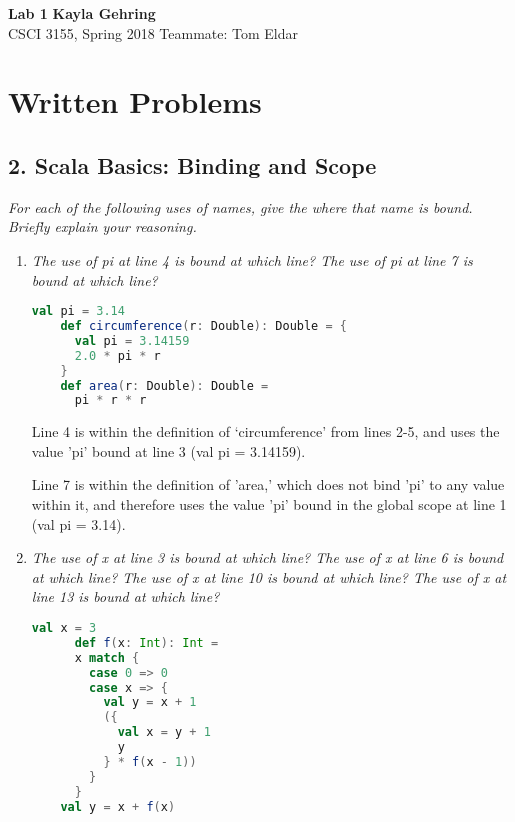 \documentclass[a4paper, 10pt]{article}
\begin{document}
\noindent
\large\textbf{Lab 1} \hfill \textbf{Kayla Gehring} \\
\normalsize CSCI 3155, Spring 2018 \hfill Teammate: Tom Eldar \\

\section*{Written Problems}

\subsection*{2. Scala Basics: Binding and Scope}
\textit{For each of the following uses of names, give the where that name is bound. Briefly explain your reasoning.}

\begin{enumerate}[label=(\alph*)]

\item\textit{The use of pi at line 4 is bound at which line? The use of pi at line 7 is bound at which line?}

  \begin{lstlisting}[language=Scala]
    val pi = 3.14
    def circumference(r: Double): Double = {
      val pi = 3.14159
      2.0 * pi * r
    }
    def area(r: Double): Double =
      pi * r * r
  \end{lstlisting}

  \vspace{0.2in}

    \large{Line 4 is within the definition of `circumference' from lines 2-5, and uses the value 'pi' bound at line 3 (val pi = 3.14159).

    Line 7 is within the definition of 'area,' which does not bind 'pi' to any value within it, and therefore uses the value 'pi' bound in the global scope at line 1 (val pi = 3.14).}

    \vspace{0.2in}

  \item
    \textit{The use of x at line 3 is bound at which line? The use of x at line 6 is bound at which line? The use of x at line 10 is bound at which line? The use of x at line 13 is bound at which line?}

    \begin{lstlisting}[language=Scala]
      val x = 3
      def f(x: Int): Int =
      x match {
        case 0 => 0
        case x => {
          val y = x + 1
          ({
            val x = y + 1
            y
          } * f(x - 1))
        }
      }
    val y = x + f(x)
  \end{lstlisting}


\end{enumerate}
\end{document}
